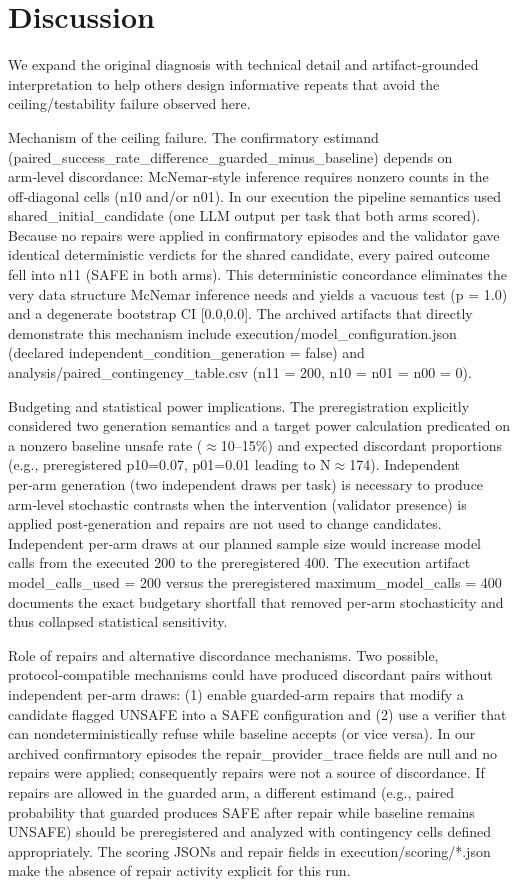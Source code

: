 \documentclass[conference]{IEEEtran}
\begin{document}
\section{Discussion}
We expand the original diagnosis with technical detail and artifact‑grounded interpretation to help others design informative repeats that avoid the ceiling/testability failure observed here.

Mechanism of the ceiling failure. The confirmatory estimand (paired\_success\_rate\_difference\_guarded\_minus\_baseline) depends on arm‑level discordance: McNemar‑style inference requires nonzero counts in the off‑diagonal cells (n10 and/or n01). In our execution the pipeline semantics used shared\_initial\_candidate (one LLM output per task that both arms scored). Because no repairs were applied in confirmatory episodes and the validator gave identical deterministic verdicts for the shared candidate, every paired outcome fell into n11 (SAFE in both arms). This deterministic concordance eliminates the very data structure McNemar inference needs and yields a vacuous test (p = 1.0) and a degenerate bootstrap CI [0.0,0.0]. The archived artifacts that directly demonstrate this mechanism include execution/model\_configuration.json (declared independent\_condition\_generation = false) and analysis/paired\_contingency\_table.csv (n11 = 200, n10 = n01 = n00 = 0).

Budgeting and statistical power implications. The preregistration explicitly considered two generation semantics and a target power calculation predicated on a nonzero baseline unsafe rate (\ensuremath{\approx}10--15\%) and expected discordant proportions (e.g., preregistered p10=0.07, p01=0.01 leading to N\ensuremath{\approx}174). Independent per‑arm generation (two independent draws per task) is necessary to produce arm‑level stochastic contrasts when the intervention (validator presence) is applied post‑generation and repairs are not used to change candidates. Independent per‑arm draws at our planned sample size would increase model calls from the executed 200 to the preregistered 400. The execution artifact model\_calls\_used = 200 versus the preregistered maximum\_model\_calls = 400 documents the exact budgetary shortfall that removed per‑arm stochasticity and thus collapsed statistical sensitivity.

Role of repairs and alternative discordance mechanisms. Two possible, protocol‑compatible mechanisms could have produced discordant pairs without independent per‑arm draws: (1) enable guarded‑arm repairs that modify a candidate flagged UNSAFE into a SAFE configuration and (2) use a verifier that can nondeterministically refuse while baseline accepts (or vice versa). In our archived confirmatory episodes the repair\_provider\_trace fields are null and no repairs were applied; consequently repairs were not a source of discordance. If repairs are allowed in the guarded arm, a different estimand (e.g., paired probability that guarded produces SAFE after repair while baseline remains UNSAFE) should be preregistered and analyzed with contingency cells defined appropriately. The scoring JSONs and repair fields in execution/scoring/*.json make the absence of repair activity explicit for this run.
\end{document}
